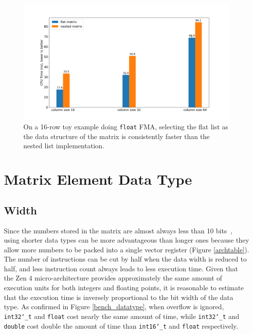 \documentclass[logo,bsc,singlespacing,parskip]{infthesis}
\newcommand{\dtshort}{\texttt{int16\char`_t}}
\newcommand{\dtint}{\texttt{int32\char`_t}}
\newcommand{\dtfloat}{\texttt{float}}
\newcommand{\dtdouble}{\texttt{double}}
\begin{document}
\begin{figure}
    \includegraphics[width=\linewidth]{image/bench_nested_flat.png}
\caption{On a 16-row toy example doing \dtfloat{} FMA, selecting the flat list as the data structure of the matrix is consistently faster than the nested list implementation.  }
    \label{fig:nested-flat}
\end{figure}


\section{Matrix Element Data Type}


\subsection{Width}
\label{sec:width} 
Since the numbers stored in the matrix are almost always less than 10 bits~\cite{FPL1}, using shorter data types can be more advantageous than longer ones because they allow more numbers to be packed into a single vector register (Figure \ref{archtable}). The number of instructions can be cut by half when the data width is reduced to half, and less instruction count always leads to less execution time. Given that the Zen 4 micro-architecture provides approximately the same amount of execution units for both integers and floating points, it is reasonable to estimate that the execution time is inversely proportional to the bit width of the data type. As confirmed in Figure \ref{bench_datatype}, when overflow is ignored, \dtint{} and \dtfloat{} cost nearly the same amount of time, while \dtint{} and \dtdouble{} cost double the amount of time than \dtshort{} and \dtfloat{} respectively.




\end{document}
